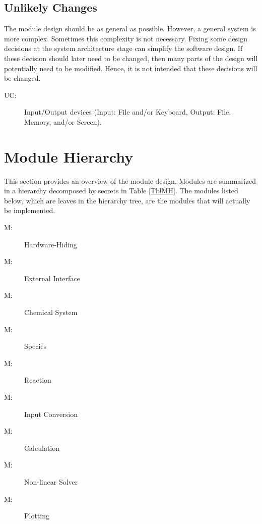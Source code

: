 \documentclass[12pt, titlepage]{article}
\newcounter{ucnum}
\newcommand{\uctheucnum}{UC\theucnum}
\newcounter{mnum}
\newcommand{\mthemnum}{M\themnum}
\begin{document}
\subsection{Unlikely Changes} \label{SecUchange}

The module design should be as general as possible. However, a general system is
more complex. Sometimes this complexity is not necessary. Fixing some design
decisions at the system architecture stage can simplify the software design. If
these decision should later need to be changed, then many parts of the design
will potentially need to be modified. Hence, it is not intended that these
decisions will be changed.

\begin{description}
\item[ \uctheucnum \label{ucIO}:] Input/Output devices
  (Input: File and/or Keyboard, Output: File, Memory, and/or Screen).
\end{description}

\section{Module Hierarchy} \label{SecMH}

This section provides an overview of the module design. Modules are summarized
in a hierarchy decomposed by secrets in Table \ref{TblMH}. The modules listed
below, which are leaves in the hierarchy tree, are the modules that will
actually be implemented.

\begin{description}
\item [ \mthemnum \label{mHH}:] Hardware-Hiding
\item [ \mthemnum \label{mEI}:] External Interface
\item [ \mthemnum \label{mCS}:] Chemical System
\item [ \mthemnum \label{mSP}:] Species
\item [ \mthemnum \label{mEP}:] Reaction
\item [ \mthemnum \label{mIC}:] Input Conversion
\item [ \mthemnum \label{mC}:] Calculation
\item [ \mthemnum \label{mNLS}:] Non-linear Solver
\item [ \mthemnum \label{mP}:] Plotting
\end{description}
\end{document}
